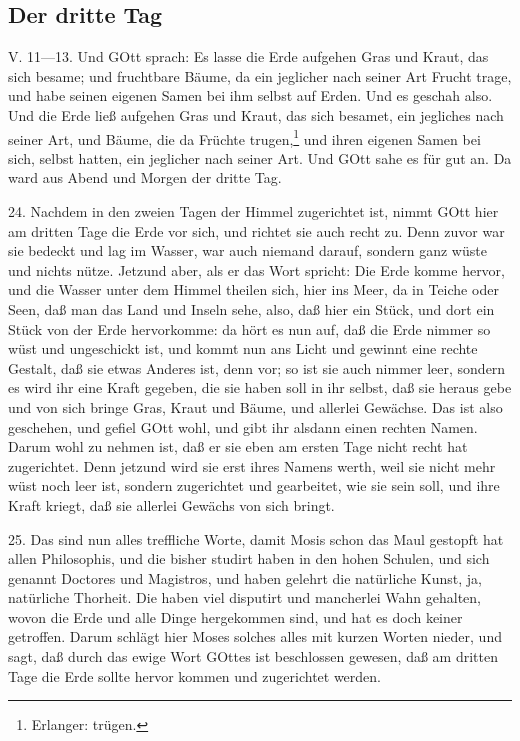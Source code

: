 \subsection{Der dritte Tag}

\begin{schriftzitat}
V. 11—13. Und GOtt sprach: Es lasse die Erde aufgehen Gras und Kraut, das sich besame; und fruchtbare Bäume, da ein jeglicher
nach seiner Art Frucht trage, und habe seinen eigenen Samen bei ihm selbst auf Erden. Und es geschah also. Und die Erde ließ aufgehen Gras und Kraut, das sich besamet, ein jegliches nach seiner Art, und Bäume, die da Früchte trugen,\footnote{Erlanger: trügen.} und ihren eigenen Samen bei sich, selbst hatten, ein jeglicher nach seiner Art. Und GOtt sahe es für gut an. Da ward aus Abend und Morgen der dritte Tag.
\end{schriftzitat}

24. Nachdem in den zweien Tagen der Himmel zugerichtet ist, nimmt GOtt hier am dritten Tage die Erde vor sich, und richtet sie auch recht zu. Denn zuvor war sie bedeckt und lag im Wasser, war auch niemand darauf, sondern ganz wüste und nichts nütze. Jetzund aber, als er das Wort spricht: Die Erde komme hervor, und die Wasser unter dem Himmel theilen sich, hier ins Meer, da in Teiche oder Seen, daß man das Land und Inseln sehe, also, daß hier ein Stück, und dort ein Stück von der Erde hervorkomme: da hört es nun auf, daß die Erde nimmer so wüst und ungeschickt ist, und kommt nun ans Licht und gewinnt eine rechte Gestalt, daß sie etwas Anderes ist, denn vor; so ist sie auch nimmer leer, sondern es wird ihr eine Kraft gegeben, die sie haben soll in ihr selbst, daß sie heraus gebe und von sich bringe Gras, Kraut und Bäume, und allerlei Gewächse. Das ist also geschehen, und gefiel GOtt wohl, und gibt ihr alsdann einen rechten Namen. Darum wohl zu nehmen ist, daß er sie eben am ersten Tage nicht recht hat zugerichtet. Denn jetzund wird sie erst ihres Namens werth, weil sie nicht mehr wüst noch leer ist, sondern zugerichtet und gearbeitet, wie sie sein soll, und ihre Kraft kriegt, daß sie allerlei Gewächs von sich bringt.

25. Das sind nun alles treffliche Worte, damit Mosis schon das Maul gestopft hat allen Philosophis, und die bisher studirt haben in den hohen Schulen, und sich genannt Doctores und Magistros, und haben gelehrt die natürliche Kunst, ja, natürliche Thorheit. Die haben viel disputirt und mancherlei Wahn gehalten, wovon die Erde und alle Dinge hergekommen sind, und hat es doch keiner getroffen. Darum schlägt hier Moses solches alles mit kurzen Worten nieder, und sagt, daß durch das ewige Wort GOttes ist beschlossen gewesen, daß am dritten Tage die Erde sollte hervor kommen und zugerichtet werden.

